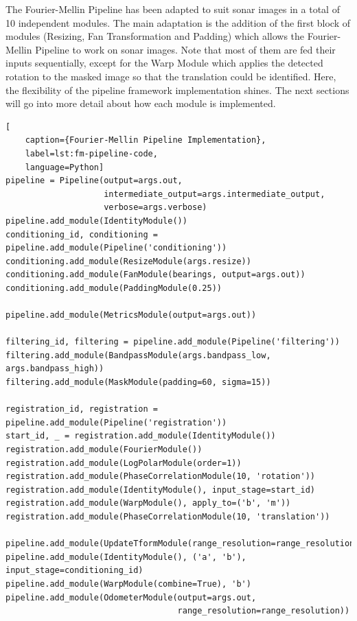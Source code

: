The Fourier-Mellin Pipeline has been adapted to suit sonar images in a total of 10 independent modules. The main adaptation is the addition of the first block of modules (Resizing, Fan Transformation and Padding) which allows the Fourier-Mellin Pipeline to work on sonar images. Note that most of them are fed their inputs sequentially, except for the Warp Module which applies the detected rotation to the masked image so that the translation could be identified. Here, the flexibility of the pipeline framework implementation shines. The next sections will go into more detail about how each module is implemented. 

\begin{lstlisting}[
    caption={Fourier-Mellin Pipeline Implementation},
    label=lst:fm-pipeline-code,
    language=Python]
pipeline = Pipeline(output=args.out, 
                    intermediate_output=args.intermediate_output, 
                    verbose=args.verbose)
pipeline.add_module(IdentityModule())
conditioning_id, conditioning = pipeline.add_module(Pipeline('conditioning'))
conditioning.add_module(ResizeModule(args.resize))
conditioning.add_module(FanModule(bearings, output=args.out))
conditioning.add_module(PaddingModule(0.25))

pipeline.add_module(MetricsModule(output=args.out))

filtering_id, filtering = pipeline.add_module(Pipeline('filtering'))
filtering.add_module(BandpassModule(args.bandpass_low, args.bandpass_high))
filtering.add_module(MaskModule(padding=60, sigma=15))

registration_id, registration = pipeline.add_module(Pipeline('registration'))
start_id, _ = registration.add_module(IdentityModule())
registration.add_module(FourierModule())
registration.add_module(LogPolarModule(order=1))
registration.add_module(PhaseCorrelationModule(10, 'rotation'))
registration.add_module(IdentityModule(), input_stage=start_id)
registration.add_module(WarpModule(), apply_to=('b', 'm'))
registration.add_module(PhaseCorrelationModule(10, 'translation'))

pipeline.add_module(UpdateTformModule(range_resolution=range_resolution))
pipeline.add_module(IdentityModule(), ('a', 'b'), input_stage=conditioning_id)
pipeline.add_module(WarpModule(combine=True), 'b')
pipeline.add_module(OdometerModule(output=args.out, 
                                   range_resolution=range_resolution))
\end{lstlisting}

